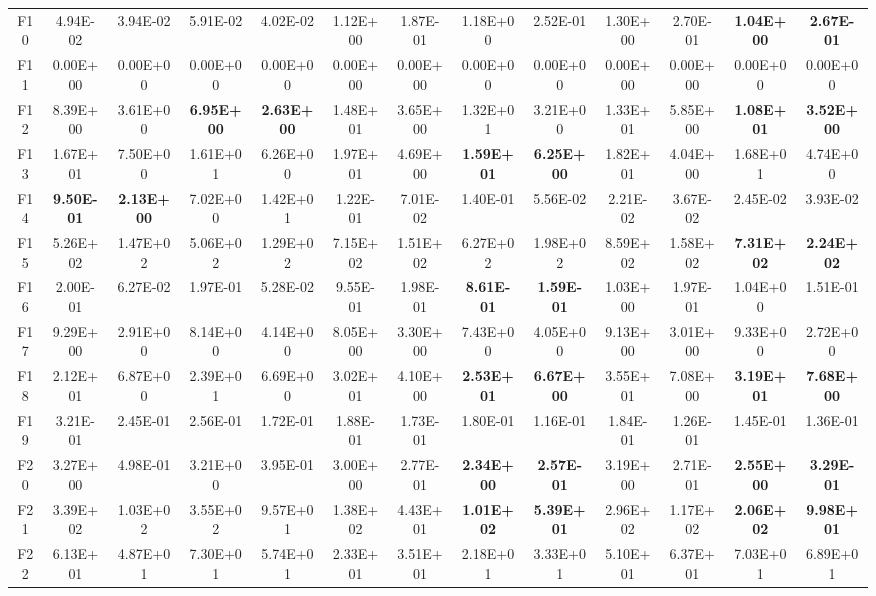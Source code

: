 \begin{table*}[!ht]
\begin{tabular}{|c|cc|cc|cc|cc|cc|cc|}
    F10   & 4.94E-02 & 3.94E-02 & 5.91E-02 & 4.02E-02 & 1.12E+00 & 1.87E-01 & 1.18E+00 & 2.52E-01 & 1.30E+00 & 2.70E-01 & \textbf{1.04E+00} & \textbf{2.67E-01} \\
    F11   & 0.00E+00 & 0.00E+00 & 0.00E+00 & 0.00E+00 & 0.00E+00 & 0.00E+00 & 0.00E+00 & 0.00E+00 & 0.00E+00 & 0.00E+00 & 0.00E+00 & 0.00E+00 \\
    F12   & 8.39E+00 & 3.61E+00 & \textbf{6.95E+00} & \textbf{2.63E+00} & 1.48E+01 & 3.65E+00 & 1.32E+01 & 3.21E+00 & 1.33E+01 & 5.85E+00 & \textbf{1.08E+01} & \textbf{3.52E+00} \\
    F13   & 1.67E+01 & 7.50E+00 & 1.61E+01 & 6.26E+00 & 1.97E+01 & 4.69E+00 & \textbf{1.59E+01} & \textbf{6.25E+00} & 1.82E+01 & 4.04E+00 & 1.68E+01 & 4.74E+00 \\
    F14   & \textbf{9.50E-01} & \textbf{2.13E+00} & 7.02E+00 & 1.42E+01 & 1.22E-01 & 7.01E-02 & 1.40E-01 & 5.56E-02 & 2.21E-02 & 3.67E-02 & 2.45E-02 & 3.93E-02 \\
    F15   & 5.26E+02 & 1.47E+02 & 5.06E+02 & 1.29E+02 & 7.15E+02 & 1.51E+02 & 6.27E+02 & 1.98E+02 & 8.59E+02 & 1.58E+02 & \textbf{7.31E+02} & \textbf{2.24E+02} \\
    F16   & 2.00E-01 & 6.27E-02 & 1.97E-01 & 5.28E-02 & 9.55E-01 & 1.98E-01 & \textbf{8.61E-01} & \textbf{1.59E-01} & 1.03E+00 & 1.97E-01 & 1.04E+00 & 1.51E-01 \\
    F17   & 9.29E+00 & 2.91E+00 & 8.14E+00 & 4.14E+00 & 8.05E+00 & 3.30E+00 & 7.43E+00 & 4.05E+00 & 9.13E+00 & 3.01E+00 & 9.33E+00 & 2.72E+00 \\
    F18   & 2.12E+01 & 6.87E+00 & 2.39E+01 & 6.69E+00 & 3.02E+01 & 4.10E+00 & \textbf{2.53E+01} & \textbf{6.67E+00} & 3.55E+01 & 7.08E+00 & \textbf{3.19E+01} & \textbf{7.68E+00} \\
    F19   & 3.21E-01 & 2.45E-01 & 2.56E-01 & 1.72E-01 & 1.88E-01 & 1.73E-01 & 1.80E-01 & 1.16E-01 & 1.84E-01 & 1.26E-01 & 1.45E-01 & 1.36E-01 \\
    F20   & 3.27E+00 & 4.98E-01 & 3.21E+00 & 3.95E-01 & 3.00E+00 & 2.77E-01 & \textbf{2.34E+00} & \textbf{2.57E-01} & 3.19E+00 & 2.71E-01 & \textbf{2.55E+00} & \textbf{3.29E-01} \\
    \hline
    F21   & 3.39E+02 & 1.03E+02 & 3.55E+02 & 9.57E+01 & 1.38E+02 & 4.43E+01 & \textbf{1.01E+02} & \textbf{5.39E+01} & 2.96E+02 & 1.17E+02 & \textbf{2.06E+02} & \textbf{9.98E+01} \\
    F22   & 6.13E+01 & 4.87E+01 & 7.30E+01 & 5.74E+01 & 2.33E+01 & 3.51E+01 & 2.18E+01 & 3.33E+01 & 5.10E+01 & 6.37E+01 & 7.03E+01 & 6.89E+01 \\

\end{tabular}
\end{table*}
